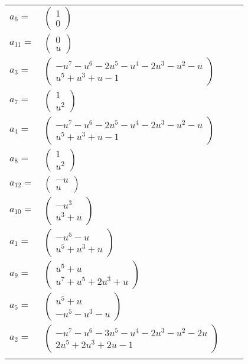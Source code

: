 \documentclass[1p]{elsarticle_modified}
\theoremstyle{definition}
\begin{document}
\begin{tabular}{m{7pt} m{180pt} m{7pt} m{180pt} }
\flushright $a_{6}=$&$\begin{pmatrix}1\\0\end{pmatrix}$ \\
\flushright $a_{11}=$&$\begin{pmatrix}0\\u\end{pmatrix}$ \\
\flushright $a_{3}=$&$\begin{pmatrix}- u^7- u^6-2 u^5- u^4-2 u^3- u^2- u\\u^5+u^3+u-1\end{pmatrix}$ \\
\flushright $a_{7}=$&$\begin{pmatrix}1\\u^2\end{pmatrix}$ \\
\flushright $a_{4}=$&$\begin{pmatrix}- u^7- u^6-2 u^5- u^4-2 u^3- u^2- u\\u^5+u^3+u-1\end{pmatrix}$ \\
\flushright $a_{8}=$&$\begin{pmatrix}1\\u^2\end{pmatrix}$ \\
\flushright $a_{12}=$&$\begin{pmatrix}- u\\u\end{pmatrix}$ \\
\flushright $a_{10}=$&$\begin{pmatrix}- u^3\\u^3+u\end{pmatrix}$ \\
\flushright $a_{1}=$&$\begin{pmatrix}- u^5- u\\u^5+u^3+u\end{pmatrix}$ \\
\flushright $a_{9}=$&$\begin{pmatrix}u^5+u\\u^7+u^5+2 u^3+u\end{pmatrix}$ \\
\flushright $a_{5}=$&$\begin{pmatrix}u^5+u\\- u^5- u^3- u\end{pmatrix}$ \\
\flushright $a_{2}=$&$\begin{pmatrix}- u^7- u^6-3 u^5- u^4-2 u^3- u^2-2 u\\2 u^5+2 u^3+2 u-1\end{pmatrix}$\\&\end{tabular}
\end{document}
